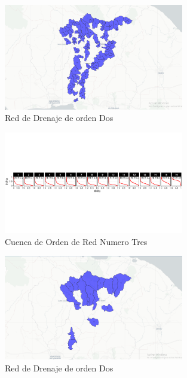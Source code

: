 \documentclass[11pt,]{article}
\begin{document}
\begin{figure}
\centering
\includegraphics[width=0.70000\textwidth]{cu drena or dos.png}
\caption{Red de Drenaje de orden Dos\label{mapatres}}
\end{figure}

\begin{figure}
\centering
\includegraphics[width=0.70000\textwidth]{cu de red or tres.png}
\caption{Cuenca de Orden de Red Numero Tres\label{mapacuatro}}
\end{figure}

\begin{figure}
\centering
\includegraphics[width=0.70000\textwidth]{cu drena or tres.png}
\caption{Red de Drenaje de orden Dos\label{mapacinco}}
\end{figure}
\end{document}
